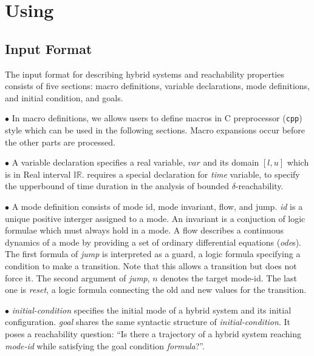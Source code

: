 \section{Using \dReach{}}\label{sec:using-dreach}
\subsection{Input Format}\label{sec:input-format}
The input format for describing hybrid systems and reachability properties consists of five
sections: macro definitions, variable declarations, mode definitions,
and initial condition, and goals.

\noindent$\bullet$
In macro definitions, we allows users to define macros in C
preprocessor (\texttt{cpp}) style which can be used in the following
sections. Macro expansions occur before the other parts are processed.

\noindent$\bullet$
        A variable declaration specifies a real variable, $var$ and its domain
$[l, u]$ which is in Real interval $\mathbb{IR}$. \drh{} requires a
special declaration for \textit{time} variable, to specify the
upperbound of time duration in the analysis of bounded
$\delta$-reachability.


\noindent$\bullet$ A mode definition consists of mode id, mode invariant, flow, and jump.
\textit{id} is a unique positive interger assigned to a mode. An
invariant is a conjuction of logic formulae which must always hold in
a mode. A flow describes a continuous dynamics of a mode by providing
a set of ordinary differential equations (\textit{ode}s). The first
formula of \textit{jump} is interpreted as a guard, a logic formula
specifying a condition to make a transition. Note that this allows a
transition but does not force it. The second argument of
\textit{jump}, $n$ denotes the target mode-id. The last one is
\textit{reset}, a logic formula connecting the old and new values for
the transition.

\noindent$\bullet$ \textit{initial-condition} specifies the initial mode of a hybrid
system and its initial configuration. \textit{goal} shares the same
syntactic structure of \textit{initial-condition}. It poses a
reachability question: ``Is there a trajectory of a hybrid system
reaching \textit{mode-id} while satisfying the goal condition
\textit{formula}?''.


